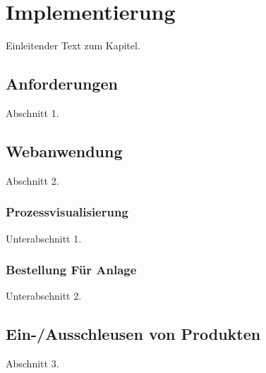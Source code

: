 \chapter{Implementierung\label{chap4:Viertes-Kapitel}}

Einleitender Text zum Kapitel.



\section{Anforderungen\label{sec4.1:Unterpunkt-1}}

Abschnitt 1.

\section{Webanwendung\label{sec4.2:Unterpunkt-2}}

Abschnitt 2.

\subsection{Prozessvisualisierung\label{sub4.2.1:Unterpunkt-1}}

Unterabschnitt 1.

\subsection{Bestellung Für Anlage\label{sub4.2.2:Unterpunkt-2}}

Unterabschnitt 2.

\section{Ein-/Ausschleusen von \glqq Produkten\grqq{}\label{sec4.3:Unterpunkt-3}}

Abschnitt 3.